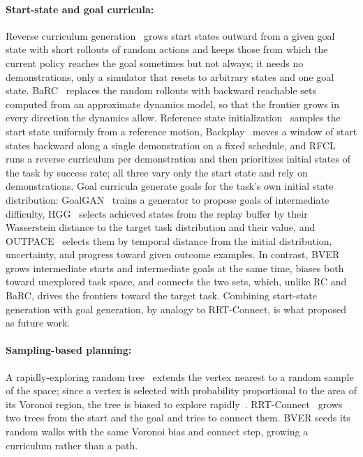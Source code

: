 \paragraph{Start-state and goal curricula:}
Reverse curriculum generation~\citep[RC;][]{florensa2017reverse} grows start states outward from a given goal state with short rollouts of random actions and keeps those from which the current policy reaches the goal sometimes but not always; it needs no demonstrations, only a simulator that resets to arbitrary states and one goal state. BaRC~\citep{ivanovic2019barc} replaces the random rollouts with backward reachable sets computed from an approximate dynamics model, so that the frontier grows in every direction the dynamics allow. Reference state initialization~\citep[RSI;][]{peng2018deepmimic} samples the start state uniformly from a reference motion, Backplay~\citep{resnick2018backplay} moves a window of start states backward along a single demonstration on a fixed schedule, and RFCL~\citep{tao2024reverse} runs a reverse curriculum per demonstration and then prioritizes initial states of the task by success rate; all three vary only the start state and rely on demonstrations. Goal curricula generate goals for the task's own initial state distribution: GoalGAN~\citep{florensa2018automatic} trains a generator to propose goals of intermediate difficulty, HGG~\citep{ren2019exploration} selects achieved states from the replay buffer by their Wasserstein distance to the target task distribution and their value, and OUTPACE~\citep{cho2023outcome} selects them by temporal distance from the initial distribution, uncertainty, and progress toward given outcome examples. In contrast, BVER grows intermediate starts and intermediate goals at the same time, biases both toward unexplored task space, and connects the two sets, which, unlike RC and BaRC, drives the frontiers toward the target task. Combining start-state generation with goal generation, by analogy to RRT-Connect, is what \citet{florensa2017reverse} proposed as future work.

\paragraph{Sampling-based planning:}
A rapidly-exploring random tree~\citep{lavalle2001randomized} extends the vertex nearest to a random sample of the space; since a vertex is selected with probability proportional to the area of its Voronoi region, the tree is biased to explore rapidly~\citep{kuffner2000rrt}. RRT-Connect~\citep{kuffner2000rrt} grows two trees from the start and the goal and tries to connect them. BVER seeds its random walks with the same Voronoi bias and connect step, growing a curriculum rather than a path.

